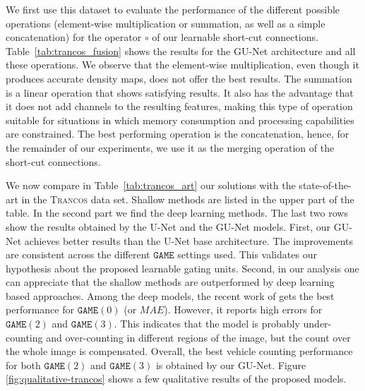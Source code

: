 \documentclass{bmvc2k}
\begin{document}
We first use this dataset to evaluate the performance of the different possible operations (element-wise multiplication or summation, as well as a simple concatenation) for the operator $\circ$ of our learnable short-cut connections. Table~\ref{tab:trancos_fusion} shows the results for the GU-Net architecture and all these operations. We observe that the element-wise multiplication, even though it produces accurate density maps, does not offer the best results. The summation is a linear operation that shows satisfying results. It also has the advantage that it does not add channels to the resulting features, making this type of operation suitable for situations in which memory consumption and processing capabilities are constrained. The best performing operation is the concatenation, hence, for the remainder of our experiments, we use it as the merging operation of the short-cut connections.

We now compare in Table~\ref{tab:trancos_art} our solutions with the state-of-the-art in the \textsc{Trancos} data set. Shallow methods are listed in the upper part of the table. In the second part we find the deep learning methods. The last two rows show the results obtained by the U-Net and the GU-Net models. First, our GU-Net achieves better results than the U-Net base architecture. The improvements are consistent across the different $\mathtt{GAME}$ settings used. This validates our hypothesis about the proposed learnable gating units. Second, in our analysis one can appreciate that the shallow methods are outperformed by deep learning based approaches. Among the deep models, the recent work of \cite{yuhong2018_csrnet} gets the best performance for $\mathtt{GAME}(0)$ (or $MAE$). However, it reports high errors for $\mathtt{GAME}(2)$ and $\mathtt{GAME}(3)$. This indicates that the model is probably under-counting and over-counting in different regions of the image, but the count over the whole image is compensated. Overall, the best vehicle counting performance for both $\mathtt{GAME}(2)$ and $\mathtt{GAME}(3)$ is obtained by our GU-Net. Figure \ref{fig:qualitative-trancos} shows a few qualitative results of the proposed models.
\end{document}
